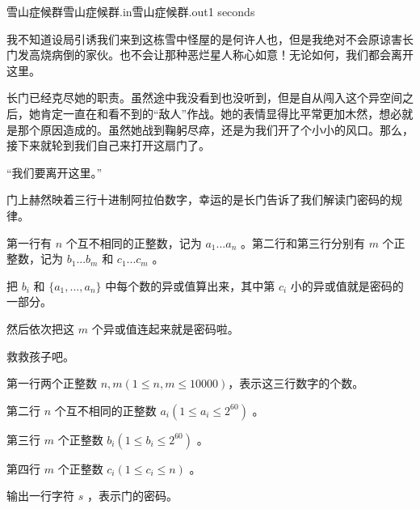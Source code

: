 \begin{problem}{雪山症候群}{雪山症候群.in}{雪山症候群.out}{1 seconds}

我不知道设局引诱我们来到这栋雪中怪屋的是何许人也，但是我绝对不会原谅害长门发高烧病倒的家伙。也不会让那种恶烂星人称心如意！无论如何，我们都会离开这里。

长门已经克尽她的职责。虽然途中我没看到也没听到，但是自从闯入这个异空间之后，她肯定一直在和看不到的“敌人”作战。她的表情显得比平常更加木然，想必就是那个原因造成的。虽然她战到鞠躬尽瘁，还是为我们开了个小小的风口。那么，接下来就轮到我们自己来打开这扇门了。

“我们要离开这里。”

门上赫然映着三行十进制阿拉伯数字，幸运的是长门告诉了我们解读门密码的规律。

第一行有 $n$ 个互不相同的正整数，记为 $a_1 ... a_n$ 。第二行和第三行分别有 $m$ 个正整数，记为 $b_1 ... b_m$ 和 $c_1 ... c_m$ 。

把 $b_i$ 和 $\{ a_1,...,a_n\}$ 中每个数的异或值算出来，其中第 $c_i$ 小的异或值就是密码的一部分。

然后依次把这 $m$ 个异或值连起来就是密码啦。

救救孩子吧。

\InputFile

第一行两个正整数 $n,m (1 \leq n,m \leq 10000)$，表示这三行数字的个数。

第二行 $n$ 个互不相同的正整数 $a_i (1 \leq a_i \leq 2^{60})$ 。

第三行 $m$ 个正整数 $b_i (1 \leq b_i \leq 2^{60})$ 。

第四行 $m$ 个正整数 $c_i (1 \leq c_i \leq n)$ 。 

\OutputFile

输出一行字符 $s$ ，表示门的密码。

\Example
\begin{example}
%
\end{example}
\end{problem}
